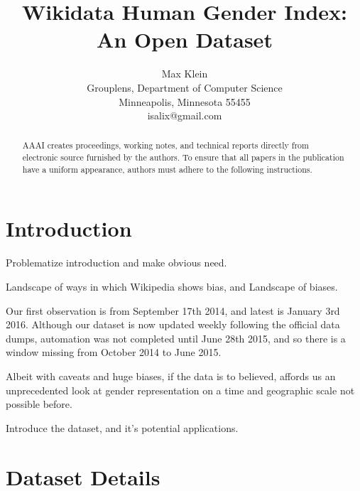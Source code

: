 \documentclass[letterpaper]{article}
\begin{document}
%
\title{Wikidata Human Gender Index: An Open Dataset}

\author{Max Klein \\
Grouplens, Department of Computer Science \\
Minneapolis, Minnesota 55455 \\
isalix@gmail.com\\
}
    
\maketitle
\begin{abstract}
AAAI creates proceedings, working notes, and technical reports directly from electronic source furnished by the authors. To ensure that all papers in the publication have a uniform appearance, authors must adhere to the following instructions. 
\end{abstract}


\section{Introduction}
Problematize introduction and make obvious need.

Landscape of ways in which Wikipedia shows bias, and Landscape of biases.

Our first observation is from September 17th 2014, and latest is January 3rd 2016. Although our dataset is now updated weekly following the official data dumps, automation was not completed until June 28th 2015, and so there is a window missing from October 2014 to June 2015. 

Albeit with caveats and huge biases, if the data is to believed, affords us an unprecedented look at gender representation on a time and geographic scale not possible before.

Introduce the dataset, and it's potential applications.	
\section{Dataset Details}
\end{document}
